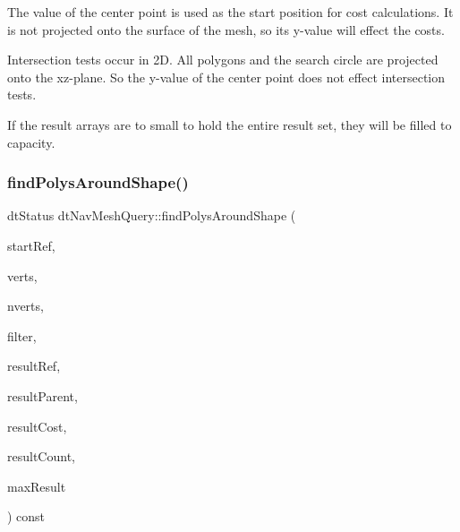 The value of the center point is used as the start position for cost calculations. It is not projected onto the surface of the mesh, so its y-\/value will effect the costs.

Intersection tests occur in 2D. All polygons and the search circle are projected onto the xz-\/plane. So the y-\/value of the center point does not effect intersection tests.

If the result arrays are to small to hold the entire result set, they will be filled to capacity. \mbox{\label{classdtNavMeshQuery_aa142b8c1e54bdefc39ab41507fe931d1}} 
\subsubsection{\texorpdfstring{find\+Polys\+Around\+Shape()}{findPolysAroundShape()}\hspace{0.1cm}{\footnotesize\ttfamily [1/2]}}
{\footnotesize\ttfamily dt\+Status dt\+Nav\+Mesh\+Query\+::find\+Polys\+Around\+Shape (\begin{DoxyParamCaption}\item[{\hyperlink{group__detour_gab4e0b2257a670c1a800057999612b466}{dt\+Poly\+Ref}}]{start\+Ref,  }\item[{const float $\ast$}]{verts,  }\item[{const int}]{nverts,  }\item[{const \hyperlink{classdtQueryFilter}{dt\+Query\+Filter} $\ast$}]{filter,  }\item[{\hyperlink{group__detour_gab4e0b2257a670c1a800057999612b466}{dt\+Poly\+Ref} $\ast$}]{result\+Ref,  }\item[{\hyperlink{group__detour_gab4e0b2257a670c1a800057999612b466}{dt\+Poly\+Ref} $\ast$}]{result\+Parent,  }\item[{float $\ast$}]{result\+Cost,  }\item[{int $\ast$}]{result\+Count,  }\item[{const int}]{max\+Result }\end{DoxyParamCaption}) const}

